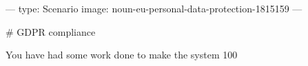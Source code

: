 ---
type: Scenario
image: noun-eu-personal-data-protection-1815159
---

# GDPR compliance

You have had some work done to make the system 100%
